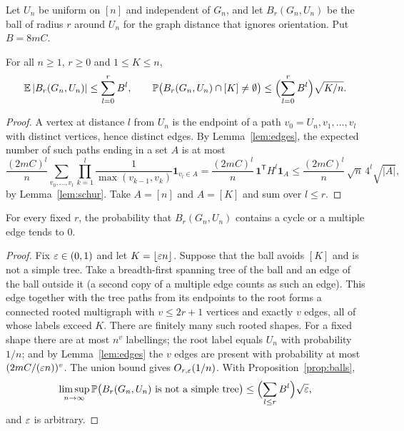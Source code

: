 Let $U_n$ be uniform on $[n]$ and independent of $G_n$, and let $B_r(G_n,U_n)$ be the ball of radius $r$ around
$U_n$ for the graph distance that ignores orientation. Put $B=8mC$.

\begin{proposition}\label{prop:balls}
For all $n\ge1$, $r\ge0$ and $1\le K\le n$,
\[
  \mathbb{E}\,|B_r(G_n,U_n)|\le\sum_{l=0}^{r}B^l,\qquad
  \mathbb{P}\bigl(B_r(G_n,U_n)\cap[K]\neq\emptyset\bigr)\le\Bigl(\sum_{l=0}^{r}B^l\Bigr)\sqrt{K/n}.
\]
\end{proposition}

\begin{proof}
A vertex at distance $l$ from $U_n$ is the endpoint of a path $v_0=U_n,v_1,\dots,v_l$ with distinct vertices,
hence distinct edges. By Lemma~\ref{lem:edges}, the expected number of such paths ending in a set $A$ is at most
\[
  \frac{(2mC)^l}{n}\sum_{v_0,\dots,v_l}\prod_{k=1}^{l}\frac{1}{\max(v_{k-1},v_k)}\mathbf 1_{v_l\in A}
  =\frac{(2mC)^l}{n}\,\mathbf 1^{\mathsf T}H^l\mathbf 1_A\le\frac{(2mC)^l}{n}\,\sqrt n\,4^l\sqrt{|A|},
\]
by Lemma~\ref{lem:schur}. Take $A=[n]$ and $A=[K]$ and sum over $l\le r$.
\end{proof}

\begin{proposition}\label{prop:cycles}
For every fixed $r$, the probability that $B_r(G_n,U_n)$ contains a cycle or a multiple edge tends to $0$.
\end{proposition}

\begin{proof}
Fix $\varepsilon\in(0,1)$ and let $K=\lfloor\varepsilon n\rfloor$. Suppose that the ball avoids $[K]$ and is not a simple tree.
Take a breadth-first spanning tree of the ball and an edge of the ball outside it (a second copy of a multiple edge
counts as such an edge). This edge together with the tree paths from its endpoints to the root forms a connected
rooted multigraph with $v\le 2r+1$ vertices and exactly $v$ edges, all of whose labels exceed $K$. There are
finitely many such rooted shapes. For a fixed shape there are at most $n^v$ labellings; the root label equals
$U_n$ with probability $1/n$; and by Lemma~\ref{lem:edges} the $v$ edges are present with probability at most
$(2mC/(\varepsilon n))^v$. The union bound gives $O_{r,\varepsilon}(1/n)$. With Proposition~\ref{prop:balls},
\[
  \limsup_{n\to\infty}\mathbb{P}\bigl(B_r(G_n,U_n)\text{ is not a simple tree}\bigr)\le\Bigl(\sum_{l\le r}B^l\Bigr)\sqrt{\varepsilon} ,
\]
and $\varepsilon$ is arbitrary.
\end{proof}

